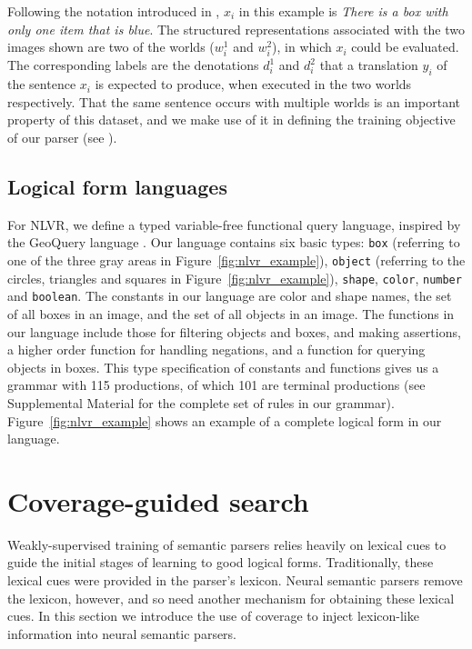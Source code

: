 Following the notation introduced in , $x_i$ in this example is \textit{There is a box with only one item that is blue}. The structured representations associated with the two images shown are two of the worlds ($w^1_i$ and $w^2_i$), in which $x_i$ could be evaluated. The corresponding labels are the denotations $d^1_i$ and $d^2_i$ that a translation $y_i$ of the sentence $x_i$ is expected to produce, when executed in the two worlds respectively. That the same sentence occurs with multiple worlds is an important property of this dataset, and we make use of it in defining the training objective of our parser (see ).
\subsection{Logical form languages} \label{sec:logical_form_languages}

For NLVR, we define a typed variable-free functional query language, inspired by the GeoQuery language \citep{zelle1996learning}. Our language contains six basic types: \texttt{box} (referring to one of the three gray areas in Figure~\ref{fig:nlvr_example}), \texttt{object} (referring to the circles, triangles and squares in Figure~\ref{fig:nlvr_example}), \texttt{shape}, \texttt{color}, \texttt{number} and \texttt{boolean}. The constants in our language are color and shape names, the set of all boxes in an image, and the set of all objects in an image. The functions in our language include those for filtering objects and boxes, and making assertions, a higher order function for handling negations, and a function for querying objects in boxes. This type specification of constants and functions gives us a grammar with 115 productions, of which 101 are terminal productions (see Supplemental Material for the complete set of rules in our grammar). Figure~\ref{fig:nlvr_example} shows an example of a complete logical form in our language.

\section{Coverage-guided search}\label{sec:coverage_guided_search}

Weakly-supervised training of semantic parsers relies heavily on lexical cues to guide the initial stages of learning to good logical forms.  Traditionally, these lexical cues were provided in the parser's lexicon.  Neural semantic parsers remove the lexicon, however, and so need another mechanism for obtaining these lexical cues.  In this section we introduce the use of coverage to inject lexicon-like information into neural semantic parsers.

